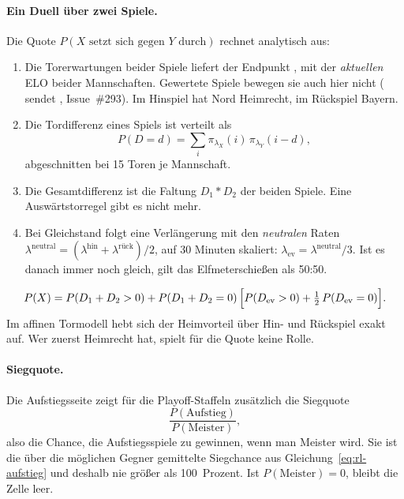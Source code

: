 \paragraph{Ein Duell über zwei Spiele.} Die Quote
$P(X \text{ setzt sich gegen } Y \text{ durch})$ rechnet
 analytisch aus:

\begin{enumerate}
  \item Die Torerwartungen beider Spiele liefert der Endpunkt
        , mit der \emph{aktuellen} ELO beider
        Mannschaften. Gewertete Spiele bewegen sie auch hier nicht
        ( sendet , Issue~\#293).
        Im Hinspiel hat Nord Heimrecht, im Rückspiel Bayern.
  \item Die Tordifferenz eines Spiels ist verteilt als
        \[
          P(D = d) = \sum_{i} \pi_{\lambda_X}(i)\,\pi_{\lambda_Y}(i - d),
        \]
        abgeschnitten bei 15 Toren je Mannschaft.
  \item Die Gesamtdifferenz ist die Faltung $D_1 * D_2$ der beiden Spiele.
        Eine Auswärtstorregel gibt es nicht mehr.
  \item Bei Gleichstand folgt eine Verlängerung mit den \emph{neutralen}
        Raten $\lambda^{\text{neutral}} = (\lambda^{\text{hin}} + \lambda^{\text{rück}})/2$,
        auf 30 Minuten skaliert: $\lambda_{\text{ev}} = \lambda^{\text{neutral}}/3$.
        Ist es danach immer noch gleich, gilt das Elfmeterschießen als
        50:50.
\end{enumerate}
\begin{equation}
  P(X) = P(D_1 + D_2 > 0) + P(D_1 + D_2 = 0)\,\Bigl[P(D_{\text{ev}} > 0) + \tfrac12\,P(D_{\text{ev}} = 0)\Bigr].
\end{equation}
Im affinen Tormodell hebt sich der Heimvorteil über Hin- und Rückspiel
exakt auf. Wer zuerst Heimrecht hat, spielt für die Quote keine Rolle.

\paragraph{Siegquote.} Die Aufstiegsseite zeigt für die Playoff-Staffeln
zusätzlich die Siegquote
\[
  \frac{P(\text{Aufstieg})}{P(\text{Meister})},
\]
also die Chance, die Aufstiegsspiele zu gewinnen, wenn man Meister wird. Sie
ist die über die möglichen Gegner gemittelte Siegchance aus
Gleichung~\eqref{eq:rl-aufstieg} und deshalb nie größer als 100~Prozent. Ist
$P(\text{Meister}) = 0$, bleibt die Zelle leer.

